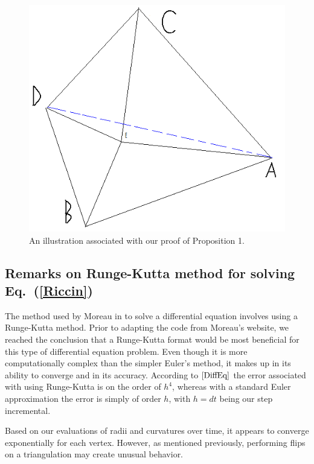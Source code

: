 \documentclass[12pt]{article}
\begin{document}
\begin{figure}
\centering
\includegraphics[scale = 0.5]{Pictures/geometry4.png}
\caption{An illustration associated with our proof of Proposition 1.}
\end{figure}

\subsection{Remarks on Runge-Kutta method for solving Eq.~(\ref{Riccin})}

The method used by Moreau in \cite{JPM} to solve a differential equation involves using a Runge-Kutta method. Prior to adapting the code from Moreau's website, we reached the conclusion that a Runge-Kutta format would be most beneficial for this type of differential equation problem. Even though it is more computationally complex than the simpler Euler's method, it makes up in its ability to converge and in its accuracy. According to $\cite{DiffEq}$ the error associated with using Runge-Kutta is on the order of $h^4$, whereas with a standard Euler approximation the error is simply of order $h$, with $h = dt$ being our step incremental.\newline

\noindent Based on our evaluations of radii and curvatures over time, it appears to converge exponentially for each vertex. However, as mentioned previously, performing flips on a triangulation may create unusual behavior.
\end{document}
